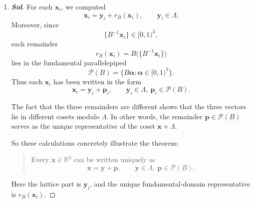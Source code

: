 \begin{enumerate}
\begin{proof}[\normalfont\color{magenta}\bfseries Sol]
Equivalently, one may check directly that none of the pairwise differences has integer \(B\)-coordinates:
\[
B^{-1}(\mathbf x_1-\mathbf x_2)
=
\begin{pmatrix}
	\frac{149}{50}\\[2pt]
	-\frac{169}{50}\\[2pt]
	-\frac4{25}
\end{pmatrix},
\quad
B^{-1}(\mathbf x_1-\mathbf x_3)
=
\begin{pmatrix}
	-\frac45\\[2pt]
	-\frac65\\[2pt]
	-\frac25
\end{pmatrix},
\quad
B^{-1}(\mathbf x_2-\mathbf x_3)
=
\begin{pmatrix}
	-\frac{189}{50}\\[2pt]
	\frac{109}{50}\\[2pt]
	-\frac6{25}
\end{pmatrix},
\]
and none of these vectors lies in \(\mathbb Z^3\). Therefore none of the differences belongs to \(\Lambda\).
\end{proof}
\item \begin{proof}[\normalfont\color{magenta}\bfseries Sol]
For each \(\mathbf x_i\), we computed
\[
\mathbf x_i=\mathbf y_i+r_B(\mathbf x_i),
\qquad
\mathbf y_i\in\Lambda.
\]
Moreover, since
\[
\{B^{-1}\mathbf x_i\}\in[0,1)^3,
\]
each remainder
\[
r_B(\mathbf x_i)=B\bigl(\{B^{-1}\mathbf x_i\}\bigr)
\]
lies in the fundamental parallelepiped
\[
\mathcal P(B)=\{B\boldsymbol\alpha:\boldsymbol\alpha\in[0,1)^3\}.
\]
Thus each \(\mathbf x_i\) has been written in the form
\[
\mathbf x_i=\mathbf y_i+\mathbf p_i,
\qquad
\mathbf y_i\in\Lambda,\ \mathbf p_i\in\mathcal P(B).
\]

The fact that the three remainders are different shows that the three vectors lie in different cosets modulo \(\Lambda\). In other words, the remainder \(\mathbf p\in\mathcal P(B)\) serves as the unique representative of the coset \(\mathbf x+\Lambda\).

So these calculations concretely illustrate the theorem:

\begin{quote}
	Every \(\mathbf x\in\mathbb R^3\) can be written uniquely as
	\[
	\mathbf x=\mathbf y+\mathbf p,
	\qquad
	\mathbf y\in\Lambda,\ \mathbf p\in\mathcal P(B).
	\]
\end{quote}

Here the lattice part is \(\mathbf y_i\), and the unique fundamental-domain representative is \(r_B(\mathbf x_i)\).
\end{proof}
\end{enumerate}
